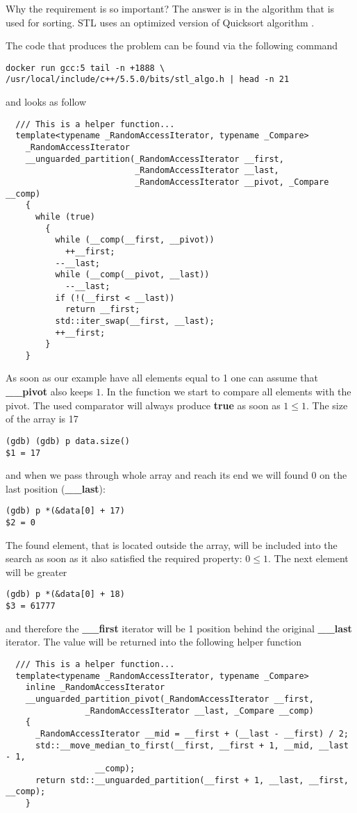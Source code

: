 \documentclass[14pt,a4paper]{article}
\begin{document}
Why the requirement is so important? The answer is in the algorithm
that is used for sorting. STL uses an optimized version of Quicksort algorithm
\cite{wiki:quicksort}. 

The code that produces the problem can be found via the following command
\begin{verbatim}
docker run gcc:5 tail -n +1888 \
/usr/local/include/c++/5.5.0/bits/stl_algo.h | head -n 21
\end{verbatim}
and looks as follow
\begin{verbatim}
  /// This is a helper function...
  template<typename _RandomAccessIterator, typename _Compare>
    _RandomAccessIterator
    __unguarded_partition(_RandomAccessIterator __first,
                          _RandomAccessIterator __last,
                          _RandomAccessIterator __pivot, _Compare __comp)
    {
      while (true)
        {
          while (__comp(__first, __pivot))
            ++__first;
          --__last;
          while (__comp(__pivot, __last))
            --__last;
          if (!(__first < __last))
            return __first;
          std::iter_swap(__first, __last);
          ++__first;
        }
    }
\end{verbatim}
As soon as our example have all elements equal to 1 one can assume
that \textbf{\_\_pivot} also keeps $1$. In the function we start to
compare all elements with the pivot. The used comparator will always
produce \textbf{true} as soon 
as $1 \le 1$. The size of the array is 17 
\begin{verbatim}
(gdb) (gdb) p data.size()
$1 = 17
\end{verbatim}
and when we pass through whole array and reach its end we
will found $0$ on the last position (\textbf{\_\_last}): 
\begin{verbatim}
(gdb) p *(&data[0] + 17)
$2 = 0
\end{verbatim}
The found element, that is located outside the array, will be
included into the search as soon as it also satisfied the required
property: $0 \le 1$. The next element will be greater  
\begin{verbatim}
(gdb) p *(&data[0] + 18)
$3 = 61777
\end{verbatim}
and therefore the \textbf{\_\_first} iterator will be 1 position
behind the original \textbf{\_\_last} iterator. The value will be
returned into the following helper function
\begin{verbatim}
  /// This is a helper function...
  template<typename _RandomAccessIterator, typename _Compare>
    inline _RandomAccessIterator
    __unguarded_partition_pivot(_RandomAccessIterator __first,
				_RandomAccessIterator __last, _Compare __comp)
    {
      _RandomAccessIterator __mid = __first + (__last - __first) / 2;
      std::__move_median_to_first(__first, __first + 1, __mid, __last - 1,
				  __comp);
      return std::__unguarded_partition(__first + 1, __last, __first, __comp);
    }
\end{verbatim}
\end{document}
